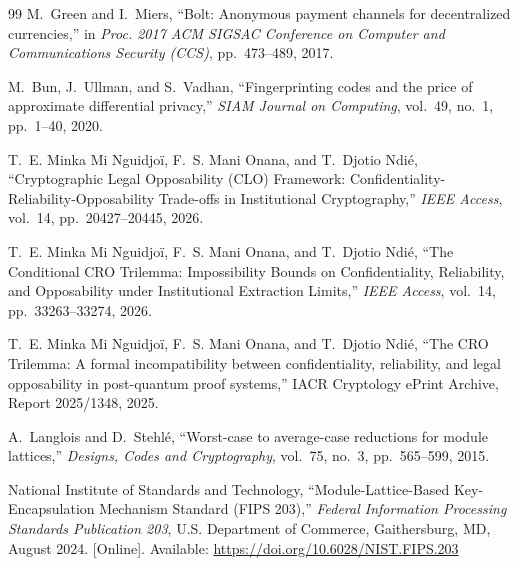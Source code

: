 \documentclass{ieeeaccess}
\begin{document}
\begin{thebibliography}{99}
M.~Green and I.~Miers, ``Bolt: Anonymous payment channels for decentralized
currencies,'' in \emph{Proc. 2017 ACM SIGSAC Conference on Computer and Communications
Security (CCS)}, pp.~473--489, 2017.

M.~Bun, J.~Ullman, and S.~Vadhan, ``Fingerprinting codes and the price of approximate
differential privacy,'' \emph{SIAM Journal on Computing}, vol.~49, no.~1, pp.~1--40, 2020.

T.~E. Minka Mi Nguidjoï, F.~S. Mani Onana, and T.~Djotio Ndié,
``Cryptographic Legal Opposability (CLO) Framework: Confidentiality-Reliability-Opposability
Trade-offs in Institutional Cryptography,'' \emph{IEEE Access}, vol.~14, pp.~20427--20445, 2026.

T.~E. Minka Mi Nguidjoï, F.~S. Mani Onana, and T.~Djotio Ndié,
``The Conditional CRO Trilemma: Impossibility Bounds on Confidentiality, Reliability,
and Opposability under Institutional Extraction Limits,'' \emph{IEEE Access}, vol.~14, pp.~33263--33274, 2026.

T.~E. Minka Mi Nguidjoï, F.~S. Mani Onana, and T.~Djotio Ndié,
``The CRO Trilemma: A formal incompatibility between confidentiality, reliability,
and legal opposability in post-quantum proof systems,''
IACR Cryptology ePrint Archive, Report 2025/1348, 2025.

A.~Langlois and D.~Stehlé,
``Worst-case to average-case reductions for module lattices,''
\emph{Designs, Codes and Cryptography},
vol.~75, no.~3, pp.~565--599, 2015.

National Institute of Standards and Technology,
``Module-Lattice-Based Key-Encapsulation Mechanism Standard
(FIPS 203),'' \emph{Federal Information Processing Standards
Publication 203}, U.S. Department of Commerce,
Gaithersburg, MD, August 2024.
[Online]. Available:
\url{https://doi.org/10.6028/NIST.FIPS.203}


\end{thebibliography}
\end{document}
